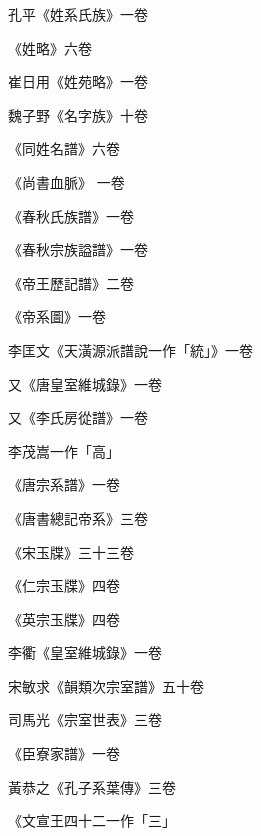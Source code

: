 \begin{pinyinscope}
 孔平《姓系氏族》一卷



 《姓略》六卷



 崔日用《姓苑略》一卷



 魏子野《名字族》十卷



 《同姓名譜》六卷



 《尚書血脈》
 一卷



 《春秋氏族譜》一卷



 《春秋宗族謚譜》一卷



 《帝王歷記譜》二卷



 《帝系圖》一卷



 李匡文《天潢源派譜說一作「統」》一卷



 又《唐皇室維城錄》一卷



 又《李氏房從譜》一卷



 李茂嵩一作「高」



 《唐宗系譜》一卷



 《唐書總記帝系》三卷



 《宋玉牒》三十三卷



 《仁宗玉牒》四卷



 《英宗玉牒》四卷



 李衢《皇室維城錄》一卷



 宋敏求《韻類次宗室譜》五十卷



 司馬光《宗室世表》三卷



 《臣寮家譜》一卷



 黃恭之《孔子系葉傳》三卷



 《文宣王四十二一作「三」




\end{pinyinscope}
